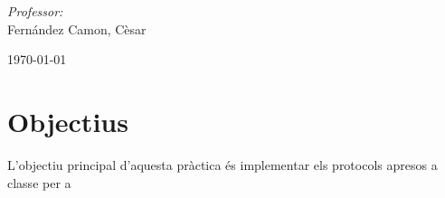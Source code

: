 \documentclass[10pt]{article}
\begin{document}
\begin{center}
\begin{minipage}{0.46\textwidth}
\begin{flushleft}
\end{flushleft}                                                                     %
\end{minipage}      
\begin{minipage}{0.52\textwidth}        
\vspace{-0.6cm}                                         %
\begin{flushright} \large                                                           %
\emph{Professor:} \\                                                                 %
Fernández Camon, Cèsar                                                    %
\end{flushright}                                                                    %
\end{minipage}  
\vspace*{1cm}
    

\begin{center}                                                                                  
{\large \today}                                                                 %
            \end{center}                                                                        
\end{center}                                                                        
                                                                                    
\newpage                                                                        

\tableofcontents
\listoffigures 

\newpage

\section{Objectius}
L'objectiu principal d'aquesta pràctica és implementar els protocols apresos a classe per a 
\end{document}

